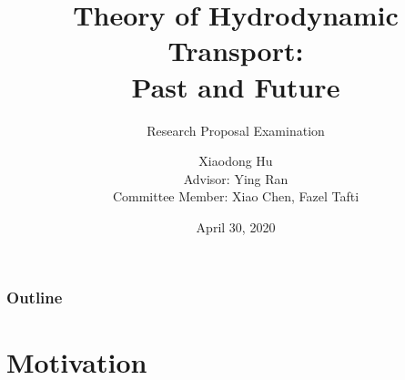\documentclass[10pt,aspectratio=43,xcolor=x11names,t]{beamer}%
\begin{document}
\title[Theory of Hydrodynamic Transport]{Theory of Hydrodynamic Transport:\\Past and Future}
\subtitle{Research Proposal Examination}
\author[Xiaodong Hu]{Xiaodong Hu\\[1em]Advisor: Ying Ran\\ Committee Member: Xiao Chen, Fazel Tafti}



\date{April 30, 2020}


\begin{frame}%
	\titlepage
\end{frame}



\begin{frame}
	\frametitle{Outline}
	\tableofcontents
\end{frame}


\section{Motivation}
\end{document}

